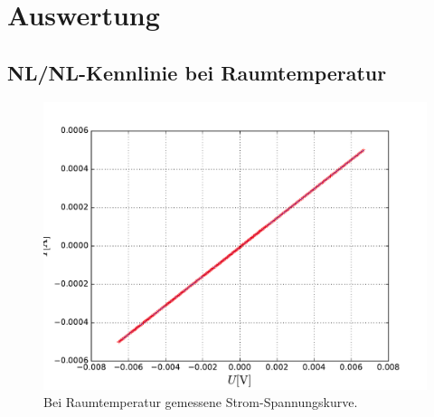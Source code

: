 \documentclass[twoside,        %
               BCOR12mm,       %
               english,ngerman, %
               fleqn,headsepline=false,footsepline=false
              ]{Vorlage/MFPREPORT}
\begin{document}
\section{Auswertung}
\label{sec:auswertung}
\subsection{NL/NL-Kennlinie bei Raumtemperatur}
\begin{figure}[]
    \centering
    \includegraphics[width=\textwidth]{fig/1.pdf}
    \caption{Bei Raumtemperatur gemessene Strom-Spannungskurve.}
    \label{fig:1}
\end{figure}
\end{document}
